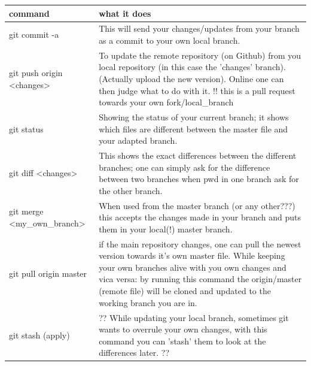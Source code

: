 \begin{center}
\begin{tabular}{p{6cm}|p{9cm}}
\textbf{command} &  \textbf{what it does} \\
\hline
  git commit -a & This will send your changes/updates from your branch as a commit to your own local branch. \\
  git push origin \textless changes\textgreater & To update the remote repository (on Github) from you local repository (in this case the 'changes' branch). (Actually upload the new version). Online one can then judge what to do with it. !! this is a pull request towards your own fork/local\_branch \\ 
  git status & Showing the status of your current branch; it shows which files are different between the master file and your adapted branch. \\
  git diff \textless changes\textgreater& This shows the exact differences between the different branches; one can simply ask for the difference between two branches when pwd in one branch ask for the other branch. \\ 
  git merge \textless my\_own\_branch\textgreater & When used from the master branch (or any other???) this accepts the changes made in your branch and puts them in your local(!) master branch. \\ 
  git pull origin master & if the main repository changes, one can pull the newest version towards it's own master file. While keeping your own branches alive with you own changes and vica versa: by running this command the origin/master (remote file) will be cloned and updated to the working branch you are in. \\
  git stash (apply) & ?? While updating your local branch, sometimes git wants to overrule your own changes, with this command you can 'stash' them to look at the differences later. ?? \\
\end{tabular}
\end{center}

